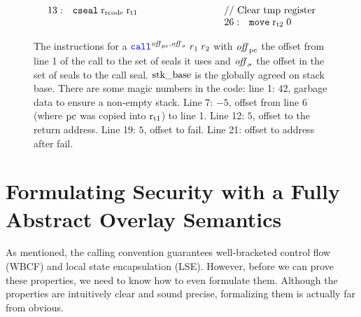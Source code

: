 \documentclass{jfp}
\renewcommand{\rretc}{\mathrm{r}_{\mathrm{rcode}}}
\begin{document}
\begin{figure}[htb]
{\[\begin{array}{r >{$}p{5.1cm}<{$} r l}
13:& \tcseal{\rretc}{\rtmp{1}}                                   &\multicolumn{2}{l}{\text{// Clear tmp register}}\\
      &    &26: & \tmove{\rtmp{2}}{0}\\
  \end{array}
\]
}
\caption{
  The instructions for a $\scall{\offpc,\offsigma}{r_1}{r_2}$ with $\mathit{off}_{\mathrm{pc}}$  the offset from line 1 of the call to the set of seals it uses and $\mathit{off}_\sigma$ the offset in the set of seals to the call seal.
  $\mathrm{stk\_base}$ is the globally agreed on stack base.
  There are some magic numbers in the code: line 1: $42$, garbage data to ensure a non-empty stack.
  Line 7: $-5$, offset from line 6 (where $\mathrm{pc}$ was copied into $\mathrm{r}_\mathrm{t1}$) to line 1.
  Line 12: $5$, offset to the return address.
  Line 19: $5$, offset to fail.
  Line 21: offset to address after fail.
}
  \label{fig:call-code}
\end{figure}



\section{Formulating Security with a Fully Abstract Overlay Semantics}
\label{sec:form-secur-with}
As mentioned, the \stktokens{} calling convention guarantees well-bracketed control flow (WBCF) and local state encapsulation (LSE).
However, before we can prove these properties, we need to know how to even formulate them.
Although the properties are intuitively clear and sound precise, formalizing them is actually far from obvious.
\end{document}
